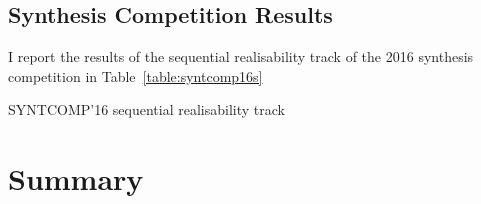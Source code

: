 
\subsection{Synthesis Competition Results}

I report the results of the sequential realisability track of the 2016 synthesis competition in Table~\ref{table:syntcomp16s}

\begin{table}

    \caption{SYNTCOMP'16 sequential realisability track}
    \label{table:syntcomp16s}
\end{table}

\section{Summary}
